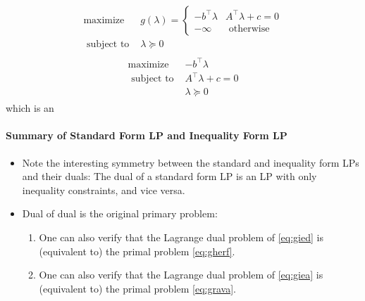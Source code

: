 \documentclass{article}
\begin{document}
\begin{align}
\begin{array}{ll}
\operatorname{maximize} & g(\lambda)= \begin{cases}-b^{\top} \lambda & A^{\top} \lambda+c=0 \\ -\infty & \text { otherwise }\end{cases} \\
\text { subject to } & \lambda \succeq 0
\end{array}
\end{align}
\begin{align}
\begin{array}{ll}
\operatorname{maximize} & -b^{\top} \lambda \\
\text { subject to } & A^{\top} \lambda+c=0 \\
& \lambda \succeq 0
\end{array}\label{eq:gied}
\end{align}
which is an 
\paragraph{Summary of Standard Form  LP and Inequality Form LP}\label{sec:hoqie}
\begin{itemize}
    \item Note the interesting symmetry between the standard and inequality form LPs and their duals: The dual of a standard form $\mathrm{LP}$ is an LP with only inequality constraints, and vice versa. 
    \item Dual of dual is the original primary problem:
    \begin{enumerate}
        \item One can also verify that the Lagrange dual problem of \cref{eq:gied} is (equivalent to) the primal problem  \cref{eq:gherf}.
        \item One can also verify that the Lagrange dual problem of \cref{eq:giea} is (equivalent to) the primal problem  \cref{eq:grava}.
    \end{enumerate}
    
\end{itemize}
\end{document}
